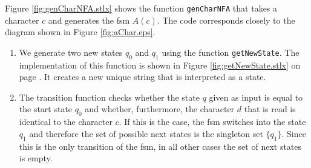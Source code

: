 \begin{enumerate}
      Figure \ref{fig:genCharNFA.stlx} shows the function \texttt{genCharNFA} that takes a
      character $c$ and generates the fsm $A(c)$.  The code corresponds closely to the
      diagram shown in Figure \ref{fig:aChar.eps}.
      \begin{enumerate}
      \item We generate two new states $q_0$ and $q_1$ using the function
            \texttt{getNewState}.  The implementation of this function is shown in Figure
            \ref{fig:getNewState.stlx} on page \pageref{fig:getNewState.stlx}.  It creates a new 
            unique string that is interpreted as a state.
      \item The transition function checks whether the state $q$ given as input is equal
            to the start state $q_0$ and whether, furthermore, the character $d$ that is
            read is identical to the character $c$.  If this is the case, the fsm switches
            into the state $q_1$ and therefore the set of possible next states is the singleton
            set $\{ q_1 \}$.  Since this is the only transition of the fsm, in all other
            cases the set of next states is empty.
      \end{enumerate}
      

\end{enumerate}
